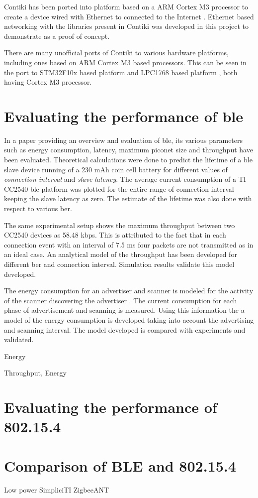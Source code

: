 Contiki has been ported into platform based on a ARM Cortex M3 processor to create a device wired with Ethernet to connected to the Internet \cite{Wilde2013a}. Ethernet based networking with the libraries present in Contiki was developed in this project to demonstrate as a proof of concept.

There are many unofficial ports of Contiki to various hardware platforms, including ones based on ARM Cortex M3 based processors. This can be seen in the port to STM32F10x based platform \cite{Padrah} and LPC1768 based platform \cite{Tanyingyong2013}, both having Cortex M3 processor.

\section{Evaluating the performance of \gls{ble}}
In a paper \cite{Gomez2012} providing an overview and evaluation of \gls{ble}, its various parameters such as energy consumption, latency, maximum piconet size and throughput have been evaluated. Theoretical calculations were done to predict the lifetime of a \gls{ble} slave device running of a 230 mAh coin cell battery for different values of \emph{connection interval} and \emph{slave latency}. The average current consumption of a TI CC2540 \gls{ble} platform was plotted for the entire range of connection interval keeping the slave latency as zero. The estimate of the lifetime was also done with respect to various \gls{ber}.

The same experimental setup \cite{Gomez2012} shows the maximum throughput between two CC2540 devices as 58.48 kbps. This is attributed to the fact that in each connection event with an interval of 7.5 ms four packets are not transmitted as in an ideal case. An analytical model of the throughput \cite{Gomez2011} has been developed for different \gls{ber} and connection interval. Simulation results validate this model developed.

The energy consumption for an advertiser and scanner is modeled for the activity of the scanner discovering the advertiser \cite{liu2012energy}. The current consumption for each phase of advertisement and scanning is measured. Using this information the a model of the energy consumption is developed taking into account the advertising and scanning interval. The model developed is compared with experiments and validated. 





Energy \cite{Kindt2014} \cite{liu2012energy}

Throughput, Energy
\cite{Mackensen2012}


\section{Evaluating the performance of 802.15.4}

\section{Comparison of BLE and 802.15.4}

Low power\cite{Siekkinen2012} SimpliciTI\cite{Mikhaylov2013} ZigbeeANT \cite{Dementyev2013}
